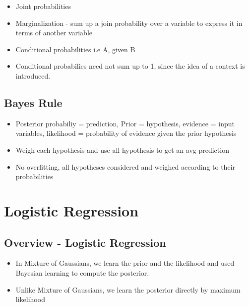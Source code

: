 \documentclass[parskip=half]{scrartcl}
\begin{document}
    \begin{itemize}
        \item
        Joint probabilities
        \item
        Marginalization - sum up a join probability over a variable to express
        it in terms of another variable
        \item
        Conditional probabilities i.e A, given B
        \item
        Conditional probabilies need not sum up to 1, since the idea of a
        context is introduced.
    \end{itemize}

    \subsection{Bayes Rule}\label{bayes-rule}

    \begin{itemize}
        \item
        Posterior probabiliy = prediction, Prior = hypothesis, evidence =
        input variables, likelihood = probability of evidence given the prior
        hypothesis
        \item
        Weigh each hypothesis and use all hypothesis to get an avg prediction
        \item
        No overfitting, all hypotheses considered and weighed according to
        their probabilities
    \end{itemize}


\section{Logistic Regression}
\label{logistic-regression}

    \subsection{Overview - Logistic Regression} %
    \label{sub:overview_logistic_regression}
    \begin{itemize}
        \item 
        In Mixture of Gaussians, we learn the prior and the likelihood and used Bayesian learning to compute the posterior.
        \item 
        Unlike Mixture of Gaussians, we learn the posterior directly by maximum likelihood
    \end{itemize}
\end{document}
